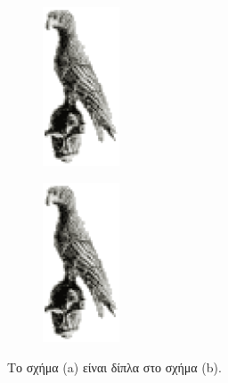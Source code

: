 \begin{figure}[t]
	\centering
	\begin{subfigure}[t]{0.49\textwidth}
		\centering
		\includegraphics[width=0.25\textwidth]{Figures/bird.eps}
		\caption{}
		\label{subfig:TwoBirdsA}
	\end{subfigure}
	\hfill
	\begin{subfigure}[t]{0.49\textwidth}
		\centering
		\includegraphics[width=0.25\textwidth]{Figures/bird.eps}
		\caption{}
		\label{subfig:TwoBirdsB}
	\end{subfigure}
	\caption{Το σχήμα (a) είναι δίπλα στο σχήμα (b).}
	\label{fig:TwoBirds}
\end{figure}